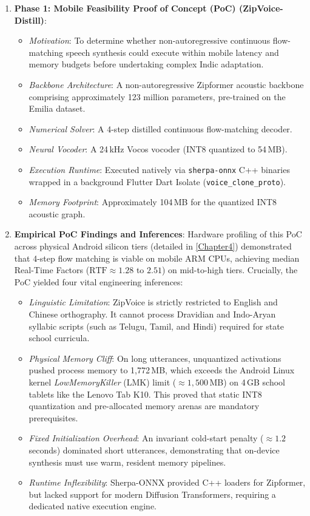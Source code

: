 \begin{enumerate}
    \item \textbf{Phase 1: Mobile Feasibility Proof of Concept (PoC) (ZipVoice-Distill)}:
    \begin{itemize}
        \item \textit{Motivation}: To determine whether non-autoregressive continuous flow-matching speech synthesis could execute within mobile latency and memory budgets before undertaking complex Indic adaptation.
        \item \textit{Backbone Architecture}: A non-autoregressive Zipformer acoustic backbone comprising approximately 123 million parameters, pre-trained on the Emilia dataset.
        \item \textit{Numerical Solver}: A 4-step distilled continuous flow-matching decoder.
        \item \textit{Neural Vocoder}: A 24\,kHz Vocos vocoder (INT8 quantized to 54\,MB).
        \item \textit{Execution Runtime}: Executed natively via \texttt{sherpa-onnx} C++ binaries wrapped in a background Flutter Dart Isolate (\texttt{voice\_clone\_proto}).
        \item \textit{Memory Footprint}: Approximately 104\,MB for the quantized INT8 acoustic graph.
    \end{itemize}
    
    \item \textbf{Empirical PoC Findings and Inferences}:
    Hardware profiling of this PoC across physical Android silicon tiers (detailed in \cref{Chapter4}) demonstrated that 4-step flow matching is viable on mobile ARM CPUs, achieving median Real-Time Factors ($\text{RTF} \approx 1.28$ to $2.51$) on mid-to-high tiers. Crucially, the PoC yielded four vital engineering inferences:
    \begin{itemize}
        \item \textit{Linguistic Limitation}: ZipVoice is strictly restricted to English and Chinese orthography. It cannot process Dravidian and Indo-Aryan syllabic scripts (such as Telugu, Tamil, and Hindi) required for state school curricula.
        \item \textit{Physical Memory Cliff}: On long utterances, unquantized activations pushed process memory to 1,772\,MB, which exceeds the Android Linux kernel \textit{LowMemoryKiller} (LMK) limit ($\approx 1,500$\,MB) on 4\,GB school tablets like the Lenovo Tab K10. This proved that static INT8 quantization and pre-allocated memory arenas are mandatory prerequisites.
        \item \textit{Fixed Initialization Overhead}: An invariant cold-start penalty ($\approx 1.2$\,seconds) dominated short utterances, demonstrating that on-device synthesis must use warm, resident memory pipelines.
        \item \textit{Runtime Inflexibility}: Sherpa-ONNX provided C++ loaders for Zipformer, but lacked support for modern Diffusion Transformers, requiring a dedicated native execution engine.
    \end{itemize}
    

\end{enumerate}
